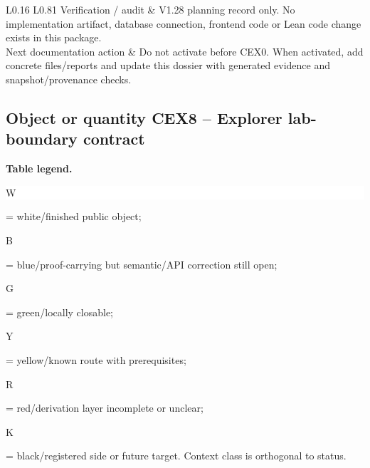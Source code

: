 \begin{longtable}{L{0.16\linewidth} L{0.81\linewidth}}
\hline\addlinespace[0.20em]
Verification /\allowbreak{} audit & V1.28 planning record only. No implementation artifact, database connection, frontend code or Lean code change exists in this package.\\
\hline\addlinespace[0.20em]
Next documentation action & Do not activate before CEX0. When activated, add concrete files/\allowbreak{}reports and update this dossier with generated evidence and snapshot/\allowbreak{}provenance checks.\\
\hline\addlinespace[0.20em]
\end{longtable}
\subsection*{Object or quantity CEX8 -- Explorer lab-boundary contract}
\hypertarget{objproof:CEX8}{}
\par\smallskip\noindent\begin{minipage}{0.99\linewidth}\footnotesize\raggedright\textbf{Table legend.} \colorbox{white}{\strut W} = white/finished public object; \colorbox{cyan!20}{\strut B} = blue/proof-carrying but semantic/API correction still open; \colorbox{green!18}{\strut G} = green/locally closable; \colorbox{yellow!25}{\strut Y} = yellow/known route with prerequisites; \colorbox{red!20}{\strut R} = red/derivation layer incomplete or unclear; \colorbox{black!18}{\strut K} = black/registered side or future target. Context class is orthogonal to status.\end{minipage}\par\vspace{0.25em}
